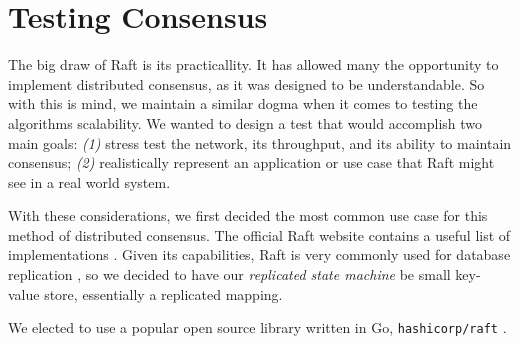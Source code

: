 \section{Testing Consensus}

	The big draw of Raft is its practicallity. It has allowed many the opportunity to implement distributed consensus, as it was designed to be understandable. So with this is mind, we maintain a similar dogma when it comes to testing the algorithms scalability. We wanted to design a test that would accomplish two main goals: \textit{(1)} stress test the network, its throughput, and its ability to maintain consensus; \textit{(2)} realistically represent an application or use case that Raft might see in a real world system.

	With these considerations, we first decided the most common use case for this method of distributed consensus. The official Raft website contains a useful list of implementations \cite{RaftSite}. Given its capabilities, Raft is very commonly used for database replication \cite{etcd, CockroachDB, TiKV, RethinkDB}, so we decided to have our \textit{replicated state machine} be small key-value store, essentially a replicated mapping.

	We elected to use a popular open source library written in Go, \texttt{hashicorp/raft} \cite{HashicorpRaft}.
